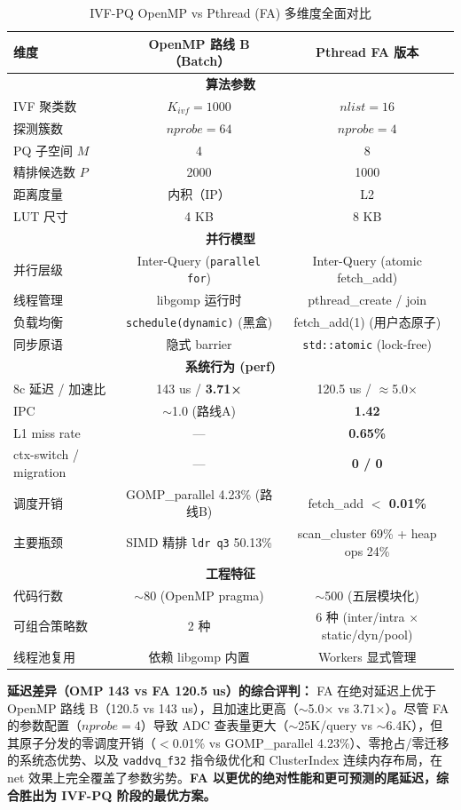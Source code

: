 \documentclass[UTF8,a4paper,10pt]{ctexart}
\begin{document}
\begin{table}[H]
\centering
\caption{IVF-PQ OpenMP vs Pthread (FA) 多维度全面对比}
\begin{tabular}{lcc}
\hline
维度 & OpenMP 路线 B（Batch） & Pthread FA 版本 \\
\hline
\multicolumn{3}{c}{\textbf{算法参数}} \\
\hline
IVF 聚类数 & $K_{ivf}=1000$ & $nlist=16$ \\
探测簇数 & $nprobe=64$ & $nprobe=4$ \\
PQ 子空间 $M$ & 4 & 8 \\
精排候选数 $P$ & 2000 & 1000 \\
距离度量 & 内积（IP） & L2 \\
LUT 尺寸 & 4 KB & 8 KB \\
\hline
\multicolumn{3}{c}{\textbf{并行模型}} \\
\hline
并行层级 & Inter-Query (\texttt{parallel for}) & Inter-Query (atomic fetch\_add) \\
线程管理 & libgomp 运行时 & pthread\_create / join \\
负载均衡 & \texttt{schedule(dynamic)} (黑盒) & fetch\_add(1) (用户态原子) \\
同步原语 & 隐式 barrier & \texttt{std::atomic} (lock-free) \\
\hline
\multicolumn{3}{c}{\textbf{系统行为 (perf)}} \\
\hline
8c 延迟 / 加速比 & 143 us / \textbf{3.71×} & 120.5 us / $\approx$5.0× \\
IPC & $\sim$1.0 (路线A) & \textbf{1.42} \\
L1 miss rate & — & \textbf{0.65\%} \\
ctx-switch / migration & — & \textbf{0 / 0} \\
调度开销 & GOMP\_parallel 4.23\% (路线B) & fetch\_add \textbf{$<$ 0.01\%} \\
主要瓶颈 & SIMD 精排 \texttt{ldr q3} 50.13\% & scan\_cluster 69\% + heap ops 24\% \\
\hline
\multicolumn{3}{c}{\textbf{工程特征}} \\
\hline
代码行数 & $\sim$80 (OpenMP pragma) & $\sim$500 (五层模块化) \\
可组合策略数 & 2 种 & 6 种 (inter/intra × static/dyn/pool) \\
线程池复用 & 依赖 libgomp 内置 & Workers 显式管理 \\
\hline
\end{tabular}
\end{table}

\textbf{延迟差异（OMP 143 vs FA 120.5 us）的综合评判：} FA 在绝对延迟上优于 OpenMP 路线 B（120.5 vs 143 us），且加速比更高（$\sim$5.0× vs 3.71×）。尽管 FA 的参数配置（$nprobe=4$）导致 ADC 查表量更大（$\sim$25K/query vs $\sim$6.4K），但其原子分发的零调度开销（$<$0.01\% vs GOMP\_parallel 4.23\%）、零抢占/零迁移的系统态优势、以及 \texttt{vaddvq\_f32} 指令级优化和 ClusterIndex 连续内存布局，在 net 效果上完全覆盖了参数劣势。\textbf{FA 以更优的绝对性能和更可预测的尾延迟，综合胜出为 IVF-PQ 阶段的最优方案。}
\end{document}
